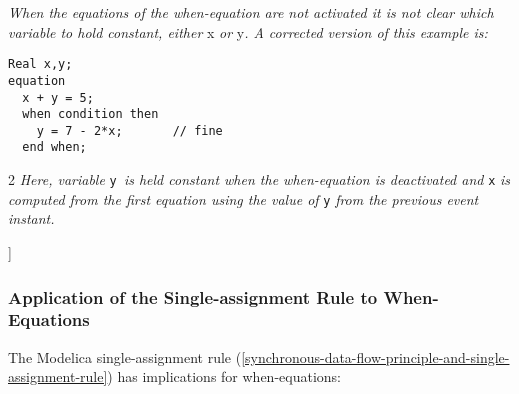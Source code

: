 \emph{When the equations of the when-equation are not activated it is
not clear which variable to hold constant, either} x \emph{or} y\emph{.
A corrected version of this example is: }

\begin{lstlisting}[language=modelica]
  Real x,y;
equation
  x + y = 5;
  when condition then
    y = 7 - 2*x;       // fine
  end when;
\end{lstlisting}
2
\emph{Here, variable} \lstinline!y !\emph{is held constant when the when-equation is
deactivated and} \lstinline!x! \emph{is computed from the first equation using the
value of} \lstinline!y! \emph{from the previous event instant.}

{]}

\subsubsection{Application of the Single-assignment Rule to When-Equations}

The Modelica single-assignment rule (\autoref{synchronous-data-flow-principle-and-single-assignment-rule}) has implications for
when-equations:

